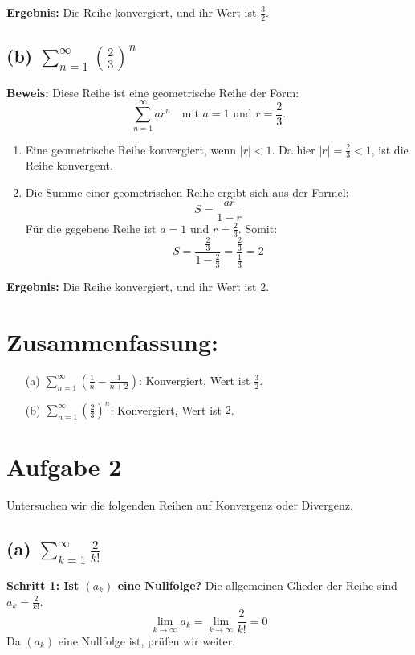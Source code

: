 \documentclass[11pt]{article}
\begin{document}
\textbf{Ergebnis:} Die Reihe konvergiert, und ihr Wert ist \(\frac{3}{2}\).

\subsection*{(b) \(\sum_{n=1}^\infty \left( \frac{2}{3} \right)^n\)}

\textbf{Beweis:}
Diese Reihe ist eine geometrische Reihe der Form:
\[
\sum_{n=1}^\infty ar^n \quad \text{mit } a = 1 \text{ und } r = \frac{2}{3}.
\]

\begin{enumerate}
    \item Eine geometrische Reihe konvergiert, wenn \(|r| < 1\). Da hier \(|r| = \frac{2}{3} < 1\), ist die Reihe konvergent.
    \item Die Summe einer geometrischen Reihe ergibt sich aus der Formel:
    \[
    S = \frac{ar}{1 - r}
    \]
    Für die gegebene Reihe ist \(a = 1\) und \(r = \frac{2}{3}\). Somit:
    \[
    S = \frac{\frac{2}{3}}{1 - \frac{2}{3}} = \frac{\frac{2}{3}}{\frac{1}{3}} = 2
    \]
\end{enumerate}

\textbf{Ergebnis:} Die Reihe konvergiert, und ihr Wert ist \(2\).

\section*{Zusammenfassung:}
\begin{enumerate}
    \item[(a)] \(\sum_{n=1}^\infty \left( \frac{1}{n} - \frac{1}{n+2} \right)\): Konvergiert, Wert ist \(\frac{3}{2}\).
    \item[(b)] \(\sum_{n=1}^\infty \left( \frac{2}{3} \right)^n\): Konvergiert, Wert ist \(2\).
\end{enumerate}


\section*{Aufgabe 2}

Untersuchen wir die folgenden Reihen auf Konvergenz oder Divergenz.

\subsection*{(a) \(\sum_{k=1}^\infty \frac{2}{k!}\)}

\textbf{Schritt 1: Ist \((a_k)\) eine Nullfolge?}
Die allgemeinen Glieder der Reihe sind \(a_k = \frac{2}{k!}\).
\[
\lim_{k \to \infty} a_k = \lim_{k \to \infty} \frac{2}{k!} = 0
\]
Da \((a_k)\) eine Nullfolge ist, prüfen wir weiter.
\end{document}

